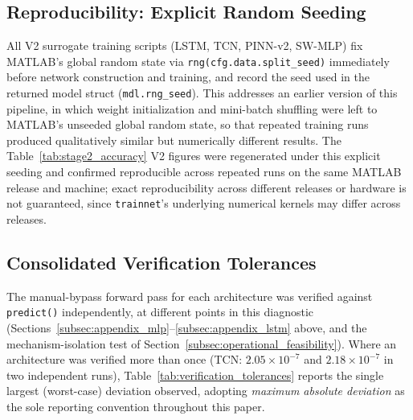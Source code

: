 \subsection{Reproducibility: Explicit Random Seeding}
\label{subsec:appendix_seeding}

All V2 surrogate training scripts (LSTM, TCN, PINN-v2, SW-MLP) fix
MATLAB's global random state via \texttt{rng(cfg.data.split\_seed)}
immediately before network construction and training, and record the
seed used in the returned model struct (\texttt{mdl.rng\_seed}). This
addresses an earlier version of this pipeline, in which weight
initialization and mini-batch shuffling were left to MATLAB's
unseeded global random state, so that repeated training runs produced
qualitatively similar but numerically different results. The Table~\ref{tab:stage2_accuracy}
V2 figures were regenerated under this explicit seeding and confirmed
reproducible across repeated runs on the same MATLAB release and
machine; exact reproducibility across different releases or hardware
is not guaranteed, since \texttt{trainnet}'s underlying numerical
kernels may differ across releases.

\subsection{Consolidated Verification Tolerances}
\label{subsec:appendix_verification_table}

The manual-bypass forward pass for each architecture was verified
against \texttt{predict()} independently, at different points in this
diagnostic (Sections~\ref{subsec:appendix_mlp}--\ref{subsec:appendix_lstm}
above, and the mechanism-isolation test of
Section~\ref{subsec:operational_feasibility}). Where an architecture
was verified more than once (TCN: $2.05\times10^{-7}$ and
$2.18\times10^{-7}$ in two independent runs), Table~\ref{tab:verification_tolerances}
reports the single largest (worst-case) deviation observed, adopting
\emph{maximum absolute deviation} as the sole reporting convention
throughout this paper.

